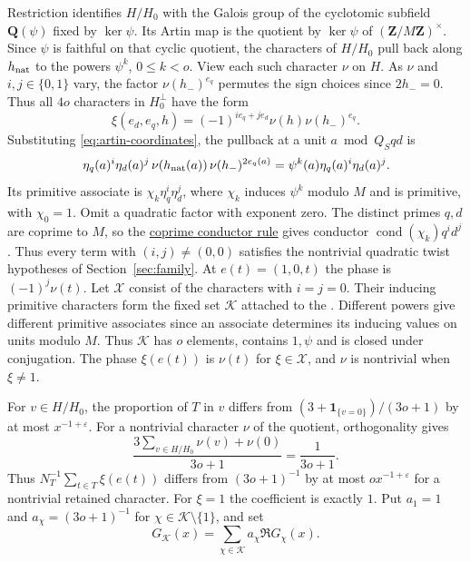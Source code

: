 Restriction identifies \(H/H_0\) with the Galois group of the
cyclotomic subfield \(\mathbf Q(\psi)\) fixed by \(\ker\psi\).
Its Artin map is the quotient by \(\ker\psi\) of
\((\mathbf Z/M\mathbf Z)^\times\). Since \(\psi\) is faithful on that
cyclic quotient, the characters of \(H/H_0\) pull back along
\(h_{\rm nat}\) to the powers \(\psi^k\), \(0\le k<o\).
View each such character \(\nu\) on \(H\). As \(\nu\) and
\(i,j\in\{0,1\}\) vary, the factor
\(\nu(h_-)^{e_q}\) permutes the sign choices since \(2h_-=0\). Thus all
\(4o\) characters in \(H_0^\perp\) have the form
\[
 \xi(e_d,e_q,h)=(-1)^{i e_q+j e_d}\nu(h)\nu(h_-)^{e_q}.
\]
Substituting \eqref{eq:artin-coordinates}, the pullback at a unit
\(a\bmod Q_Sqd\) is
\[
 \eta_q(a)^i\eta_d(a)^j\,\nu(h_{\rm nat}(a))\,\nu(h_-)^{2e_q(a)}
 =\psi^k(a)\eta_q(a)^i\eta_d(a)^j .
\]
Its primitive associate is \(\chi_k\eta_q^i\eta_d^j\), where \(\chi_k\)
induces \(\psi^k\) modulo \(M\) and is primitive, with \(\chi_0=1\).
Omit a quadratic factor with exponent zero. The distinct primes
\(q,d\) are coprime to \(M\), so the
\hyperlink{proof.coprime-character-product}{coprime conductor rule}
gives conductor \(\operatorname{cond}(\chi_k)q^id^j\). Thus every term
with \((i,j)\ne(0,0)\) satisfies the nontrivial quadratic twist hypotheses
of Section~\ref{sec:family}.
At \(e(t)=(1,0,t)\) the phase is \((-1)^j\nu(t)\).
Let \(\mathcal X\) consist of the characters with \(i=j=0\).
Their inducing primitive characters form
the fixed set \(\mathcal K\) attached to the
.
Different powers give different primitive associates since an associate
determines its inducing values on units modulo \(M\). Thus \(\mathcal K\)
has \(o\) elements, contains \(1,\psi\) and is closed under conjugation.
The phase \(\xi(e(t))\) is \(\nu(t)\) for \(\xi\in\mathcal X\), and
\(\nu\) is nontrivial when \(\xi\ne1\).

For \(v\in H/H_0\), the proportion of \(T\) in \(v\) differs from
\((3+\mathbf 1_{\{v=0\}})/(3o+1)\) by at most \(x^{-1+\varepsilon}\).
For a nontrivial character \(\nu\) of the quotient, orthogonality gives
\[
 \frac{3\sum_{v\in H/H_0}\nu(v)+\nu(0)}{3o+1}=\frac{1}{3o+1}.
\]
Thus \(N_T^{-1}\sum_{t\in T}\xi(e(t))\) differs from
\((3o+1)^{-1}\) by at most \(o x^{-1+\varepsilon}\) for a nontrivial
retained character. For \(\xi=1\) the coefficient is exactly \(1\).
Put \(a_1=1\) and \(a_\chi=(3o+1)^{-1}\) for
\(\chi\in\mathcal K\setminus\{1\}\), and set
\[
 G_{\mathcal K}(x)=\sum_{\chi\in\mathcal K}a_\chi\Re G_\chi(x).
\]

